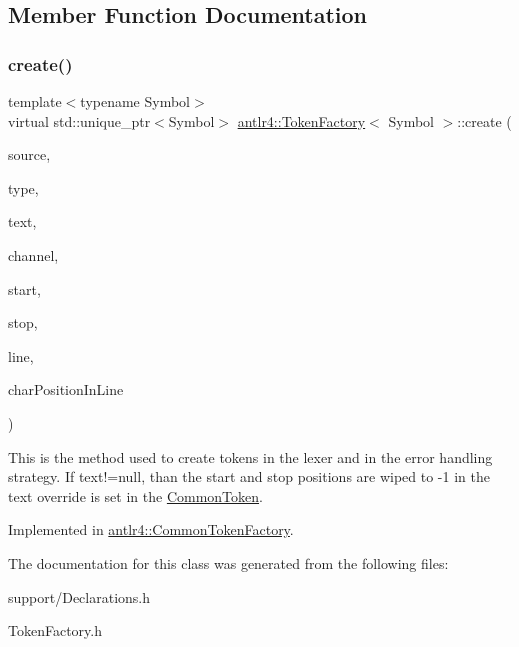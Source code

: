 \subsection{Member Function Documentation}
\mbox{\label{classantlr4_1_1TokenFactory_a25efd6b38907e594ddc848887fbd7303}} 
\subsubsection{\texorpdfstring{create()}{create()}}
{\footnotesize\ttfamily template$<$typename Symbol$>$ \\
virtual std\+::unique\+\_\+ptr$<$Symbol$>$ \hyperlink{classantlr4_1_1TokenFactory}{antlr4\+::\+Token\+Factory}$<$ Symbol $>$\+::create (\begin{DoxyParamCaption}\item[{std\+::pair$<$ \hyperlink{classantlr4_1_1TokenSource}{Token\+Source} $\ast$, Char\+Stream $\ast$$>$}]{source,  }\item[{size\+\_\+t}]{type,  }\item[{const std\+::string \&}]{text,  }\item[{size\+\_\+t}]{channel,  }\item[{size\+\_\+t}]{start,  }\item[{size\+\_\+t}]{stop,  }\item[{size\+\_\+t}]{line,  }\item[{size\+\_\+t}]{char\+Position\+In\+Line }\end{DoxyParamCaption})\hspace{0.3cm}{\ttfamily [pure virtual]}}

This is the method used to create tokens in the lexer and in the error handling strategy. If text!=null, than the start and stop positions are wiped to -\/1 in the text override is set in the \hyperlink{classantlr4_1_1CommonToken}{Common\+Token}. 

Implemented in \hyperlink{classantlr4_1_1CommonTokenFactory_ae5b0ee244ce69cf24a71c81167328be1}{antlr4\+::\+Common\+Token\+Factory}.



The documentation for this class was generated from the following files\+:\begin{DoxyCompactItemize}
\item 
support/Declarations.\+h\item 
Token\+Factory.\+h\end{DoxyCompactItemize}
